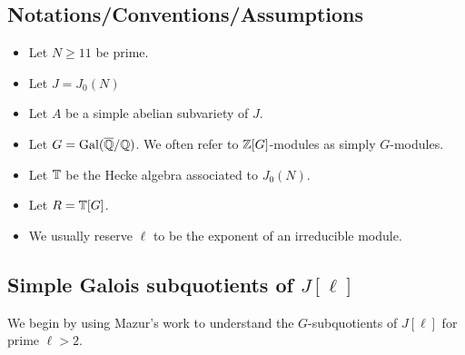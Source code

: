 \documentclass{article}
\begin{document}
\subsection{Notations/Conventions/Assumptions}

\begin{itemize}
    \item
        Let $N\geq 11$ be prime.
    \item
        Let $J=J_0(N)$
    \item
        Let $A$ be a simple abelian subvariety of $J$.
    \item
        Let $G=\operatorname{Gal}(\overline{\mathbb{Q}}/\mathbb{Q})$. We often refer to $\mathbb{Z}[G]$-modules as simply
        $G$-modules.
    \item
        Let $\mathbb{T}$ be the Hecke algebra associated to $J_0(N)$.
    \item
        Let $R=\mathbb{T}[G]$.
    \item
        We usually reserve $\ell$ to be the exponent of an irreducible module.
\end{itemize}

\subsection{Simple Galois subquotients of $J[\ell]$}

We begin by using Mazur's work to understand the $G$-subquotients of $J[\ell]$
for prime $\ell>2$.
\end{document}

